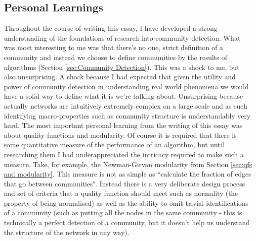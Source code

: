 \subsection{Personal Learnings}
Throughout the course of writing this essay, I have developed a strong understanding of the foundations of research into community detection. What was most interesting to me was that there's no one, strict definition of a community and instead we choose to define communities by the results of algorithms (Section \ref{sec:Community Detection}). This was a shock to me, but also unsurprising. A shock because I had expected that given the utility and power of community detection in understanding real world phenomena we would have a solid way to define what it is we're talking about. Unsurprising because actually networks are intuitively extremely complex on a large scale and as such identifying macro-properties such as community structure is understandably very hard. The most important personal learning from the writing of this essay was about quality functions and modularity. Of course it is required that there is some quantitative measure of the performance of an algorithm, but until researching them I had underappreciated the intricacy required to make such a measure. Take, for example, the Newman-Girvan modularity from Section \ref{sec:qfs and modularity}. This measure is not as simple as ``calculate the fraction of edges that go between communities". Instead there is a very deliberate design process and set of criteria that a quality function should meet such as normality (the property of being normalised) as well as the ability to omit trivial identifications of a community (such as putting all the nodes in the same community - this is technically a perfect detection of a community, but it doesn't help us understand the structure of the network in any way).

